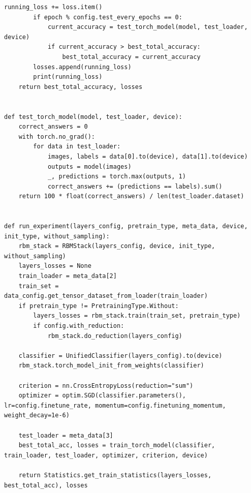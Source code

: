 \begin{lstlisting}[style=PythonStyle]
            running_loss += loss.item()
        if epoch % config.test_every_epochs == 0:
            current_accuracy = test_torch_model(model, test_loader, device)
            if current_accuracy > best_total_accuracy:
                best_total_accuracy = current_accuracy
        losses.append(running_loss)
        print(running_loss)
    return best_total_accuracy, losses


def test_torch_model(model, test_loader, device):
    correct_answers = 0
    with torch.no_grad():
        for data in test_loader:
            images, labels = data[0].to(device), data[1].to(device)
            outputs = model(images)
            _, predictions = torch.max(outputs, 1)
            correct_answers += (predictions == labels).sum()
    return 100 * float(correct_answers) / len(test_loader.dataset)


def run_experiment(layers_config, pretrain_type, meta_data, device, init_type, without_sampling):
    rbm_stack = RBMStack(layers_config, device, init_type, without_sampling)
    layers_losses = None
    train_loader = meta_data[2]
    train_set = data_config.get_tensor_dataset_from_loader(train_loader)
    if pretrain_type != PretrainingType.Without:
        layers_losses = rbm_stack.train(train_set, pretrain_type)
        if config.with_reduction:
            rbm_stack.do_reduction(layers_config)

    classifier = UnifiedClassifier(layers_config).to(device)
    rbm_stack.torch_model_init_from_weights(classifier)

    criterion = nn.CrossEntropyLoss(reduction="sum")
    optimizer = optim.SGD(classifier.parameters(), lr=config.finetune_rate, momentum=config.finetuning_momentum, weight_decay=1e-6)

    test_loader = meta_data[3]
    best_total_acc, losses = train_torch_model(classifier, train_loader, test_loader, optimizer, criterion, device)

    return Statistics.get_train_statistics(layers_losses, best_total_acc), losses
\end{lstlisting}


